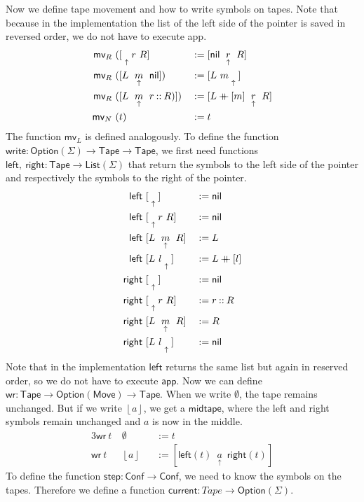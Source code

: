 \documentclass{psartcl}
\newcommand{\MS}[1]{\textsf{#1}}
\newcommand{\nil}{\MS{nil}}
\newcommand{\cons}{\mathbin{::}}
\newcommand\mdoubleplus{\ensuremath{\mathbin{+\mkern-10mu+}}}
\newcommand{\app}{\mdoubleplus}
\newcommand{\from}{:}
\renewcommand{\to}{\rightarrow}
\newcommand{\Option}{\MS{Option}}
\newcommand{\List}{\MS{List}}
\newcommand{\Some}[1]{\left\lfloor #1\right\rfloor}
\renewcommand{\None}{\emptyset}
\newcommand{\tape}[1]{[ #1 ]}
\newcommand{\tapePointer}[1]{\; \underset{\uparrow}{#1} \;}
\newcommand{\niltape}{\tape{\tapePointer{}}}
\newcommand{\midtape}[3]{\tape{#1 ~ \tapePointer{#2} ~ #3}}
\newcommand{\leftof}[2]{\tape{\tapePointer{} #1 ~ #2}}
\newcommand{\rightof}[2]{\tape{#1 ~ #2 \tapePointer{}}}
\newcommand{\Tape}{\MS{Tape}}
\newcommand{\Move}{\MS{Move}}
\begin{document}
Now we define tape movement and how to write symbols on tapes.  Note that because in the implementation the list of the left side of the pointer is
saved in reversed order, we do not have to execute \MS{app}.  \begin{alignat*}{2}
  \MS{mv}_R&~(\leftof{r}{R}               &&:= \midtape{\nil}{r}{R} \\
  \MS{mv}_R&~(\midtape{L}{m}{\nil})       &&:= \rightof{L}{m} \\
  \MS{mv}_R&~(\midtape{L}{m}{r \cons R)}) &&:= \midtape{L \app [m]}{r}{R} \\
  \MS{mv}_N&~(t)                          &&:= t
\end{alignat*}
The function $\MS{mv}_L$ is defined analogously.
To define the function $\MS{write} \from \Option(\Sigma) \to \Tape \to \Tape$, we first need functions
$\MS{left},~\MS{right} \from \Tape \to \List(\Sigma)$
that return the symbols to the left side of the pointer and respectively the symbols to the right of the pointer.
\begin{alignat*}{2}
  \MS{left} &~\niltape          &&:= \nil \\
  \MS{left} &~\leftof{r}{R}     &&:= \nil \\
  \MS{left} &~\midtape{L}{m}{R} &&:= L \\
  \MS{left} &~\rightof{L}{l}    &&:= L \app [l] \\
  \MS{right}&~\niltape          &&:= \nil \\
  \MS{right}&~\leftof{r}{R}     &&:= r \cons R \\
  \MS{right}&~\midtape{L}{m}{R} &&:= R \\
  \MS{right}&~\rightof{L}{l}    &&:= \nil
\end{alignat*}
Note that in the implementation $\MS{left}$ returns the same list but again in reserved order, so we do not have to execute $\MS{app}$.
Now we can define $\MS{wr} \from \Tape \to \Option(\Move) \to \Tape$.
When we write $\None$, the tape remains unchanged.
But if we write $\Some a$, we get a $\MS{midtape}$, where the left and right symbols remain unchanged and $a$ is now in the middle.
\begin{alignat*}{3}
  \MS{wr}~t &~ \None   &&:= t \\
  \MS{wr}~t &~ \Some a &&:= \midtape{\MS{left}(t)}{a}{\MS{right}(t)}
\end{alignat*}
To define the function $\MS{step} \from \MS{Conf} \to \MS{Conf}$, we need to know the symbols on the tapes.
Therefore we define a function $\MS{current} \from Tape \to \Option(\Sigma)$.
\end{document}
